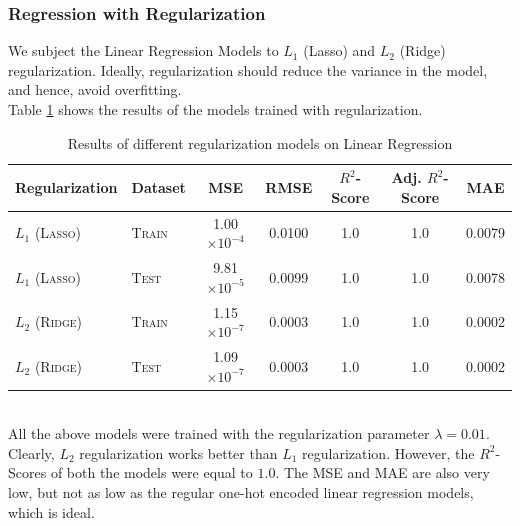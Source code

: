 \documentclass[12pt]{article}
\begin{document}
    \subsubsection*{Regression with Regularization}
    We subject the Linear Regression Models to $L_{1}$ (Lasso) and $L_{2}$ (Ridge) regularization.
    Ideally, regularization should reduce the variance in the model, and hence, avoid overfitting.
    \vspace*{5pt} \\
    Table \ref{tab:regularization} shows the results of the models trained with regularization.
    \begin{table}[htbp]
        \centering
        \begin{tabular}{|l|l|c|c|c|c|c|}
            \hline
            Regularization & Dataset & MSE & RMSE & $R^{2}$-Score & Adj. $R^{2}$-Score & MAE \\
            \hline \hline
            $L_{1}$ \textsc{(Lasso)} & \textsc{Train} & 1.00 $\times 10^{-4}$ & 0.0100 & 1.0 & 1.0 & 0.0079 \\
            \hline
            $L_{1}$ \textsc{(Lasso)} & \textsc{Test} & 9.81 $\times 10^{-5}$ & 0.0099 & 1.0 & 1.0 & 0.0078 \\
            \hline
            $L_{2}$ \textsc{(Ridge)} & \textsc{Train} & 1.15 $\times 10^{-7}$ & 0.0003 & 1.0 & 1.0 & 0.0002 \\
            \hline
            $L_{2}$ \textsc{(Ridge)} & \textsc{Test} & 1.09 $\times 10^{-7}$ & 0.0003 & 1.0 & 1.0 & 0.0002 \\
            \hline
        \end{tabular}
        \caption{Results of different regularization models on Linear Regression}
        \label{tab:regularization}
    \end{table}
    \vspace*{5pt} \\
    All the above models were trained with the regularization parameter $\lambda = 0.01$.
    Clearly, $L_{2}$ regularization works better than $L_{1}$ regularization. However, the $R^{2}$-Scores
    of both the models were equal to $1.0$. The MSE and MAE are also very low, but not as low as the regular
    one-hot encoded linear regression models, which is ideal.

    \vfill
\end{document}
